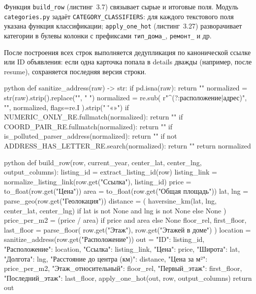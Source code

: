 Функция \texttt{build\_row} (листинг~3.7) связывает сырые и итоговые поля. Модуль \texttt{categories.py} задаёт \texttt{CATEGORY\_CLASSIFIERS}: для каждого текстового поля указана функция классификации; \texttt{apply\_one\_hot} (листинг~3.27) разворачивает категории в булевы колонки с префиксами \texttt{тип\_дома\_}, \texttt{ремонт\_} и др.

После построения всех строк выполняется дедупликация по канонической ссылке или ID объявления: если одна карточка попала в details дважды (например, после resume), сохраняется последняя версия строки.

\begin{singleminted}{python}
def sanitize_address(raw) -> str:
    if pd.isna(raw):
        return ""
    normalized = str(raw).strip().replace("", " ")
    normalized = re.sub(
        r"^(?:расположение|адрес)\s*[:\-]\s*", "", normalized, flags=re.I
    ).strip(" \"'«»")
    if NUMERIC_ONLY_RE.fullmatch(normalized):
        return ""
    if COORD_PAIR_RE.fullmatch(normalized):
        return ""
    if is_polluted_parser_address(normalized):
        return ""
    if not ADDRESS_HAS_LETTER_RE.search(normalized):
        return ""
    return normalized
\end{singleminted}
\label{lst:sanitize-address}

\begin{singleminted}{python}
def build_row(row, current_year, center_lat, center_lng, output_columns):
    listing_id = extract_listing_id(row)
    listing_link = normalize_listing_link(row.get("Ссылка"), listing_id)
    price = to_float(row.get("Цена"))
    area = to_float(row.get("Общая площадь"))
    lat, lng = parse_geo(row.get("Геолокация"))
    distance = (
        haversine_km(lat, lng, center_lat, center_lng)
        if lat is not None and lng is not None else None
    )
    price_per_m2 = (price / area) if price and area else None
    floor_rel, first_floor, last_floor = parse_floor(
        row.get("Этаж"), row.get("Этажей в доме")
    )
    location = sanitize_address(row.get("Расположение"))
    out = {
        "ID": listing_id,
        "Расположение": location,
        "Ссылка": listing_link,
        "Цена": price,
        "Широта": lat, "Долгота": lng,
        "Расстояние до центра (км)": distance,
        "Цена за м²": price_per_m2,
        "Этаж_относительный": floor_rel,
        "Первый_этаж": first_floor,
        "Последний_этаж": last_floor,
    }
    apply_one_hot(out, row, output_columns)
    return out
\end{singleminted}
\label{lst:etl-build-row}

